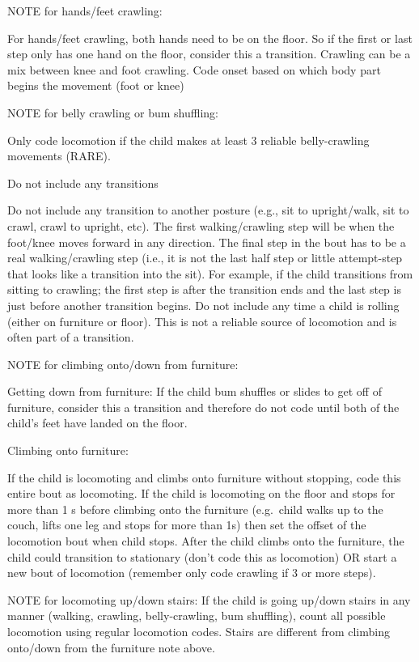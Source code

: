 \documentclass[
  12pt,
]{book}
\begin{document}
NOTE for hands/feet crawling:

For hands/feet crawling, both hands need to be on the floor. So if the first or last step only has one hand on the floor, consider this a transition.
Crawling can be a mix between knee and foot crawling. Code onset based on which body part begins the movement (foot or knee)

NOTE for belly crawling or bum shuffling:

Only code locomotion if the child makes at least 3 reliable belly-crawling movements (RARE).

Do not include any transitions

Do not include any transition to another posture (e.g., sit to upright/walk, sit to crawl, crawl to upright, etc). The first walking/crawling step will be when the foot/knee moves forward in any direction. The final step in the bout has to be a real walking/crawling step (i.e., it is not the last half step or little attempt-step that looks like a transition into the sit). For example, if the child transitions from sitting to crawling; the first step is after the transition ends and the last step is just before another transition begins.
Do not include any time a child is rolling (either on furniture or floor). This is not a reliable source of locomotion and is often part of a transition.

NOTE for climbing onto/down from furniture:

Getting down from furniture: If the child bum shuffles or slides to get off of furniture, consider this a transition and therefore do not code until both of the child's feet have landed on the floor.

Climbing onto furniture:

If the child is locomoting and climbs onto furniture without stopping, code this entire bout as locomoting.
If the child is locomoting on the floor and stops for more than 1 s before climbing onto the furniture (e.g.~child walks up to the couch, lifts one leg and stops for more than 1s) then set the offset of the locomotion bout when child stops. After the child climbs onto the furniture, the child could transition to stationary (don't code this as locomotion) OR start a new bout of locomotion (remember only code crawling if 3 or more steps).

NOTE for locomoting up/down stairs:
If the child is going up/down stairs in any manner (walking, crawling, belly-crawling, bum shuffling), count all possible locomotion using regular locomotion codes. Stairs are different from climbing onto/down from the furniture note above.
\end{document}
